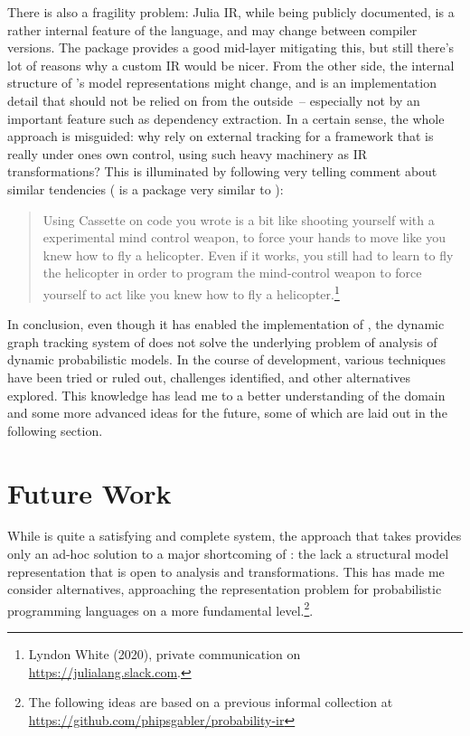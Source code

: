 There is also a fragility problem: Julia IR, while being publicly documented, is a rather internal
feature of the language, and may change between compiler versions.  The 
package provides a good mid-layer mitigating this, but still there's lot of reasons why a custom IR
would be nicer.  From the other side, the internal structure of \dppljl{}'s model representations
might change, and is an implementation detail that should not be relied on from the outside~--
especially not by an important feature such as dependency extraction.  In a certain sense, the whole
approach is misguided: why rely on external tracking for a framework that is really under ones own
control, using such heavy machinery as IR transformations?  This is illuminated by following very
telling comment about similar tendencies ( is a package very similar to
):
\begin{quote}
  Using Cassette on code you wrote is a bit like shooting yourself with a experimental mind control
  weapon, to force your hands to move like you knew how to fly a helicopter.  Even if it works, you
  still had to learn to fly the helicopter in order to program the mind-control weapon to force
  yourself to act like you knew how to fly a helicopter.\footnote{Lyndon White (2020), private
    communication on \protect\url{https://julialang.slack.com}.}
\end{quote}

In conclusion, even though it has enabled the implementation of \autogibbsjl{}, the dynamic graph
tracking system of \irtrackerjl{} does not solve the underlying problem of analysis of dynamic
probabilistic models.  In the course of development, various techniques have been tried or ruled
out, challenges identified, and other alternatives explored.  This knowledge has lead me to a better
understanding of the domain and some more advanced ideas for the future, some of which are laid out
in the following section.


\section{Future Work}
\label{sec:future-work}

While \irtrackerjl{} is quite a satisfying and complete system, the approach that \autogibbsjl{}
takes provides only an ad-hoc solution to a major shortcoming of \turingjl{}: the lack a structural
model representation that is open to analysis and transformations.  This has made me consider
alternatives, approaching the representation problem for probabilistic programming languages on a
more fundamental level.\footnote{The following ideas are based on a previous informal collection at
  \protect\url{https://github.com/phipsgabler/probability-ir}}.

